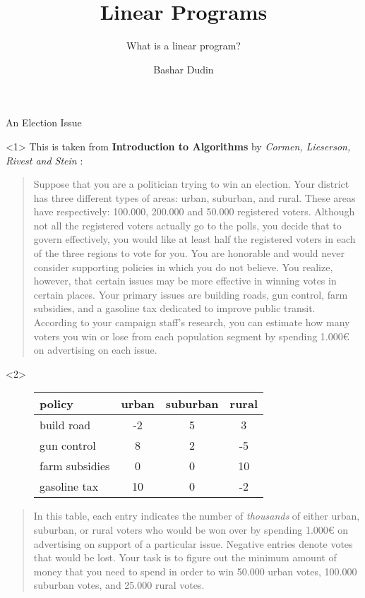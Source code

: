 \documentclass[aspectratio = 169]{beamer}
\author[BD]{Bashar Dudin}
\institute[]{EPITA}
\title{Linear Programs} %
\subtitle{What is a linear program?}
\begin{document}
\begin{frame}[plain]
\titlepage %
\end{frame}

\begin{frame}{An Election Issue}
    \begin{onlyenv}<1>
      This is taken from \textbf{Introduction to Algorithms} by
      \emph{Cormen, Lieserson, Rivest and Stein} :
        \begin{quotation}
          Suppose that you are a politician trying to win an
          election. Your district has three different types of areas:
          urban, suburban, and rural. These areas have respectively:
          100.000, 200.000 and 50.000 registered voters. Although not
          all the registered voters actually go to the polls, you
          decide that to govern effectively, you would like at least
          half the registered voters in each of the three regions to
          vote for you. You are honorable and would never consider
          supporting policies in which you do not believe. You
          realize, however, that certain issues may be more effective
          in winning votes in certain places. Your primary issues are
          building roads, gun control, farm subsidies, and a gasoline
          tax dedicated to improve public transit. According to your
          campaign staff's research, you can estimate how many voters
          you win or lose from each population segment by spending
          1.000€ on advertising on each issue.
        \end{quotation}
    \end{onlyenv}
    \begin{onlyenv}<2>
        \begin{figure}
            \begin{tabular}{l|ccc}
                policy & urban & suburban & rural \\
                \hline
                build road & -2 & 5 & 3 \\
                gun control & 8 & 2 & -5 \\
                farm subsidies & 0 & 0 & 10 \\
                gasoline tax & 10 & 0 & -2
            \end{tabular}
        \end{figure}
        \begin{quotation}
          In this table, each entry indicates the number of
          \emph{thousands} of either urban, suburban, or rural voters
          who would be won over by spending 1.000€ on advertising on
          support of a particular issue. Negative entries denote votes
          that would be lost. Your task is to figure out the minimum
          amount of money that you need to spend in order to win
          50.000 urban votes, 100.000 suburban votes, and 25.000 rural
          votes.
        \end{quotation}
    \end{onlyenv}
\end{frame}
\end{document}
